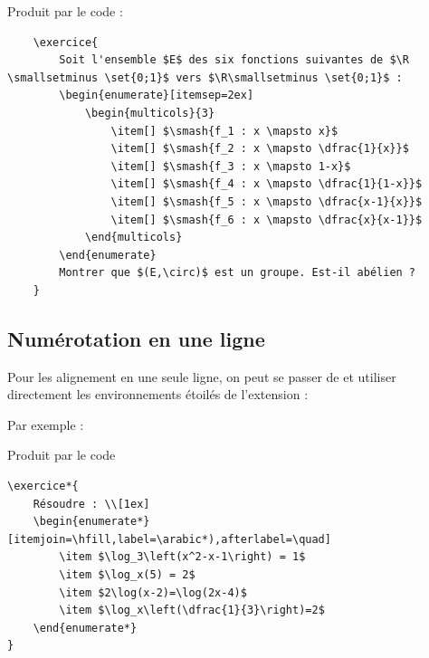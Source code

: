 Produit par le code :

\begin{verbatim}
	\exercice{
		Soit l'ensemble $E$ des six fonctions suivantes de $\R \smallsetminus \set{0;1}$ vers $\R\smallsetminus \set{0;1}$ :
		\begin{enumerate}[itemsep=2ex]
			\begin{multicols}{3}
				\item[] $\smash{f_1 : x \mapsto x}$
				\item[] $\smash{f_2 : x \mapsto \dfrac{1}{x}}$
				\item[] $\smash{f_3 : x \mapsto 1-x}$
				\item[] $\smash{f_4 : x \mapsto \dfrac{1}{1-x}}$
				\item[] $\smash{f_5 : x \mapsto \dfrac{x-1}{x}}$
				\item[] $\smash{f_6 : x \mapsto \dfrac{x}{x-1}}$
			\end{multicols}
		\end{enumerate}
		Montrer que $(E,\circ)$ est un groupe. Est-il abélien ?
	}
\end{verbatim}



\subsection{Numérotation en une ligne}

Pour les alignement en une seule ligne, on peut se passer de  et utiliser directement les environnements étoilés de l'extension  :

Par exemple :


Produit par le code

\begin{verbatim}
\exercice*{
	Résoudre : \\[1ex]
	\begin{enumerate*}[itemjoin=\hfill,label=\arabic*),afterlabel=\quad]
		\item $\log_3\left(x^2-x-1\right) = 1$
		\item $\log_x(5) = 2$
		\item $2\log(x-2)=\log(2x-4)$
		\item $\log_x\left(\dfrac{1}{3}\right)=2$
	\end{enumerate*}
}
\end{verbatim}

